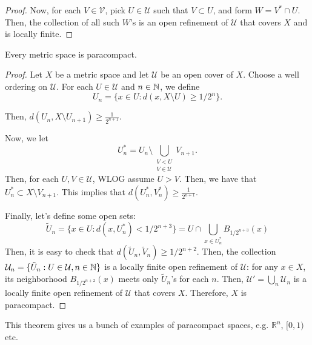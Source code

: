 \begin{proof}
    
    Now, for each $V\in \mathcal{V}$, pick $U\in \mathcal{U}$ such that $V\subset U$, and form $W=V^*\cap U$. Then, the collection of all such $W$'s is an open refinement of $\mathcal{U}$ that covers $X$ and is locally finite.
\end{proof}


\begin{theorem}
    Every metric space is paracompact.
\end{theorem}
\begin{proof}
    Let $X$ be a metric space and let $\mathcal{U}$ be an open cover of $X$. Choose a well ordering on $\mathcal{U}$. For each $U\in \mathcal{U}$ and $n\in \mathbb{N}$, we define
    \[ U_n=\{x\in U:d(x,X\setminus U)\geq 1/2^n\}.\]

    Then, $d(U_n,X\setminus U_{n+1})\geq \frac{1}{2^{n+1}}$.

    Now, we let 
    \[U_n^*=U_n\setminus \bigcup_{\substack{V<U\\V\in \mathcal{U}}} V_{n+1}.\]
    Then, for each $U,V\in \mathcal{U}$, WLOG assume $U>V$. Then, we have that
    $U_n^*\subset X\setminus V_{n+1}$. This implies that $d(U_n^*,V_n^*)\geq \frac{1}{2^{n+1}}$.

    Finally, let's define some open sets:
    \[\tilde{U}_n=\{x\in U:d(x,U_n^*)<1/2^{n+3}\}=U\cap \bigcup_{x\in U_n^*} B_{1/2^{n+3}}(x)\]
    Then, it is easy to check that $d(\tilde{U}_n, \tilde{V}_n)\geq 1/2^{n+2}$. Then, the collection $\mathcal{U}_n=\{\tilde{U}_n:U\in \mathcal{U},n\in \mathbb{N}\}$ is a locally finite open refinement of $\mathcal{U}$: for any $x\in X$, its neighborhood $B_{1/2^{n+2}}(x)$ meets only $\tilde{U}_n$'s for each $n$. Then, $\mathcal{U}'=\bigcup_n \mathcal{U}_n$ is a locally finite open refinement of $\mathcal{U}$ that covers $X$. Therefore, $X$ is paracompact.
\end{proof}

\begin{example}
    This theorem gives us a bunch of examples of paracompact spaces, e.g. \(\mathbb{R}^n\), $[0,1)$ etc.
\end{example}

